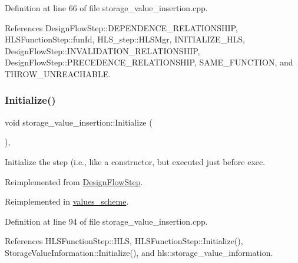Definition at line 66 of file storage\+\_\+value\+\_\+insertion.\+cpp.



References Design\+Flow\+Step\+::\+D\+E\+P\+E\+N\+D\+E\+N\+C\+E\+\_\+\+R\+E\+L\+A\+T\+I\+O\+N\+S\+H\+IP, H\+L\+S\+Function\+Step\+::fun\+Id, H\+L\+S\+\_\+step\+::\+H\+L\+S\+Mgr, I\+N\+I\+T\+I\+A\+L\+I\+Z\+E\+\_\+\+H\+LS, Design\+Flow\+Step\+::\+I\+N\+V\+A\+L\+I\+D\+A\+T\+I\+O\+N\+\_\+\+R\+E\+L\+A\+T\+I\+O\+N\+S\+H\+IP, Design\+Flow\+Step\+::\+P\+R\+E\+C\+E\+D\+E\+N\+C\+E\+\_\+\+R\+E\+L\+A\+T\+I\+O\+N\+S\+H\+IP, S\+A\+M\+E\+\_\+\+F\+U\+N\+C\+T\+I\+ON, and T\+H\+R\+O\+W\+\_\+\+U\+N\+R\+E\+A\+C\+H\+A\+B\+LE.

\mbox{\label{classstorage__value__insertion_a43f36ebf82f907a629125b1f0cc1b096}} 
\subsubsection{\texorpdfstring{Initialize()}{Initialize()}}
{\footnotesize\ttfamily void storage\+\_\+value\+\_\+insertion\+::\+Initialize (\begin{DoxyParamCaption}{ }\end{DoxyParamCaption})\hspace{0.3cm}{\ttfamily [override]}, {\ttfamily [virtual]}}



Initialize the step (i.\+e., like a constructor, but executed just before exec. 



Reimplemented from \hyperlink{classDesignFlowStep_a44b50683382a094976e1d432a7784799}{Design\+Flow\+Step}.



Reimplemented in \hyperlink{classvalues__scheme_aa31c876e845bc7ea78495e0b789cc51f}{values\+\_\+scheme}.



Definition at line 94 of file storage\+\_\+value\+\_\+insertion.\+cpp.



References H\+L\+S\+Function\+Step\+::\+H\+LS, H\+L\+S\+Function\+Step\+::\+Initialize(), Storage\+Value\+Information\+::\+Initialize(), and hls\+::storage\+\_\+value\+\_\+information.

